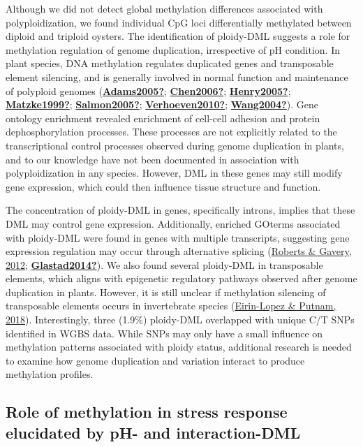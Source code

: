 \documentclass [11pt, proquest] {uwthesis}[2015/03/03]
\begin{document}
Although we did not detect global methylation differences associated with polyploidization, we found individual CpG loci differentially methylated between diploid and triploid oysters. The identification of ploidy-DML suggests a role for methylation regulation of genome duplication, irrespective of pH condition. In plant species, DNA methylation regulates duplicated genes and transposable element silencing, and is generally involved in normal function and maintenance of polyploid genomes (\protect\hyperlink{ref-Adams2005}{\textbf{Adams2005?}}; \protect\hyperlink{ref-Chen2006}{\textbf{Chen2006?}}; \protect\hyperlink{ref-Henry2005}{\textbf{Henry2005?}}; \protect\hyperlink{ref-Matzke1999}{\textbf{Matzke1999?}}; \protect\hyperlink{ref-Salmon2005}{\textbf{Salmon2005?}}; \protect\hyperlink{ref-Verhoeven2010}{\textbf{Verhoeven2010?}}; \protect\hyperlink{ref-Wang2004}{\textbf{Wang2004?}}). Gene ontology enrichment revealed enrichment of cell-cell adhesion and protein dephosphorylation processes. These processes are not explicitly related to the transcriptional control processes observed during genome duplication in plants, and to our knowledge have not been documented in association with polyploidization in any species. However, DML in these genes may still modify gene expression, which could then influence tissue structure and function.

The concentration of ploidy-DML in genes, specifically introns, implies that these DML may control gene expression. Additionally, enriched GOterms associated with ploidy-DML were found in genes with multiple transcripts, suggesting gene expression regulation may occur through alternative splicing (\protect\hyperlink{ref-Roberts2012}{Roberts \& Gavery, 2012}; \protect\hyperlink{ref-Glastad2014}{\textbf{Glastad2014?}}). We also found several ploidy-DML in transposable elements, which aligns with epigenetic regulatory pathways observed after genome duplication in plants. However, it is still unclear if methylation silencing of transposable elements occurs in invertebrate species (\protect\hyperlink{ref-Eirin-Lopez2018}{Eirin-Lopez \& Putnam, 2018}). Interestingly, three (1.9\%) ploidy-DML overlapped with unique C/T SNPs identified in WGBS data. While SNPs may only have a small influence on methylation patterns associated with ploidy status, additional research is needed to examine how genome duplication and variation interact to produce methylation profiles.

\hypertarget{role-of-methylation-in-stress-response-elucidated-by-ph--and-interaction-dml}{%
\subsection{Role of methylation in stress response elucidated by pH- and interaction-DML}\label{role-of-methylation-in-stress-response-elucidated-by-ph--and-interaction-dml}}
\end{document}
